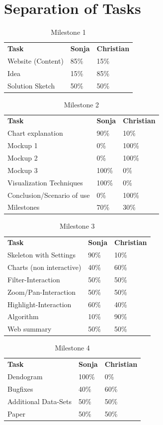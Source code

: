 \documentclass{vgtc} %
\begin{document}
\section{Separation of Tasks}
\begin{table}[htb]
\centering
\caption{Milestone 1}
\label{my-label}
\begin{tabular}{@{} p{4cm}p{1cm}p{1cm} @{}}
\textbf{Task} & \textbf{Sonja} & \textbf{Christian} \\
 Website (Content) & 85\% & 15\%\\
 Idea & 15\% & 85\%\\
 Solution Sketch & 50\% & 50\%
\end{tabular}
\end{table}
\FloatBarrier
\begin{table}[htb]
\centering
\caption{Milestone 2}
\label{my-label}
\begin{tabular}{@{} p{4cm}p{1cm}p{1cm} @{}}
\textbf{Task} & \textbf{Sonja} & \textbf{Christian} \\
 Chart explanation & 90\% & 10\%\\
 Mockup 1 & 0\% & 100\%\\
 Mockup 2 & 0\% & 100\%\\
 Mockup 3 & 100\% & 0\%\\
 Visualization Techniques & 100\% & 0\%\\
 Conclusion/Scenario of use & 0\% & 100\%\\
 Milestones & 70\% & 30\%
\end{tabular}
\end{table}
\FloatBarrier
\begin{table}[htb]
\centering
\caption{Milestone 3}
\label{my-label}
\begin{tabular}{@{} p{4cm}p{1cm}p{1cm} @{}}
\textbf{Task} & \textbf{Sonja} & \textbf{Christian} \\
 Skeleton with Settings & 90\% & 10\%\\
 Charts (non interactive) & 40\% &  60\%\\
 Filter-Interaction & 50\% & 50\%\\
 Zoom/Pan-Interaction & 50\% & 50\%\\
 Highlight-Interaction & 60\% & 40\%\\
 Algorithm & 10\% & 90\%\\
 Web summary & 50\% & 50\%
\end{tabular}
\end{table}
\FloatBarrier
\begin{table}[htb]
\centering
\caption{Milestone 4}
\label{my-label}
\begin{tabular}{@{} p{4cm}p{1cm}p{1cm} @{}}
\textbf{Task} & \textbf{Sonja} & \textbf{Christian} \\
Dendogram & 100\% & 0\%\\
Bugfixes & 40\% & 60\%\\
Additional Data-Sets & 50\% & 50\%\\
Paper & 50\% & 50\%
\end{tabular}
\end{table}
\FloatBarrier
\end{document}
